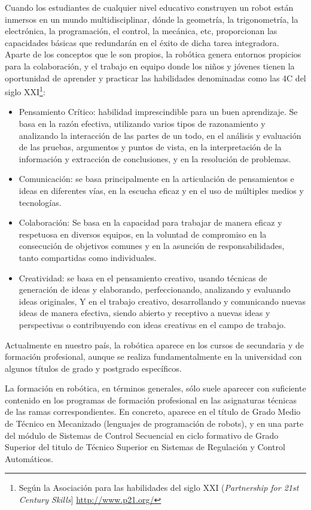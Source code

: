 Cuando los estudiantes de cualquier nivel  educativo construyen un robot están inmersos en un mundo multidisciplinar, dónde la geometría, la trigonometría, la electrónica, la programación, el  control, la mecánica, etc, proporcionan las capacidades básicas que redundarán en el éxito de dicha tarea integradora. Aparte de los conceptos que le son propios, la robótica genera entornos propicios para la colaboración, y el trabajo en equipo donde los niños y jóvenes tienen la oportunidad de aprender y practicar las habilidades  denominadas como las 4C del siglo XXI\footnote{Según la Asociación para las habilidades del siglo XXI (\textit{Partnership for 21st Century Skills}] \url{http://www.p21.org/}}:
\begin{itemize}
	\item Pensamiento Crítico: habilidad imprescindible para un buen aprendizaje. Se basa en la razón efectiva, utilizando varios tipos de razonamiento y analizando la interacción de las partes de un todo, en el análisis y evaluación de las pruebas, argumentos y puntos de vista, en la interpretación de la información y extracción de conclusiones, y en la resolución de problemas.
	\item Comunicación: se basa principalmente en la articulación de pensamientos e ideas en diferentes vías, en la escucha eficaz y en el uso de múltiples medios y tecnologías.
	\item Colaboración: Se basa en la capacidad para trabajar de manera eficaz y respetuosa en diversos equipos, en la voluntad de compromiso en la consecución de objetivos comunes y en la asunción de responsabilidades, tanto compartidas como individuales.
	\item Creatividad: se basa en el pensamiento creativo, usando técnicas de generación de ideas y elaborando, perfeccionando, analizando y evaluando ideas originales, Y en el trabajo creativo, desarrollando y comunicando nuevas ideas de manera efectiva, siendo abierto y receptivo a nuevas ideas y perspectivas o contribuyendo con ideas creativas en el campo de trabajo.
\end{itemize}

Actualmente en nuestro país, la robótica aparece en los cursos de secundaria y de formación profesional, aunque se realiza fundamentalmente en la universidad con algunos títulos de grado y postgrado específicos. 

La formación en robótica, en términos generales, sólo suele aparecer con suficiente contenido en los programas de formación profesional en las asignaturas técnicas  de  las  ramas correspondientes. En  concreto, aparece en el título de Grado Medio de Técnico en Mecanizado (lenguajes de programación de robots), y en una parte del módulo de Sistemas de Control Secuencial en ciclo formativo de Grado Superior del titulo de Técnico Superior en Sistemas de Regulación y Control Automáticos.

